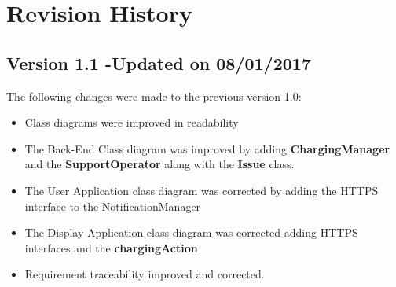 \section{Revision History}
\subsection{Version 1.1 -Updated on 08/01/2017}
The following changes were made to the previous version 1.0:
\begin{itemize}
\item Class diagrams were improved in readability
\item The Back-End Class diagram was improved by adding \textbf{ChargingManager} and the \textbf{SupportOperator} along with the \textbf{Issue} class.
\item The User Application class diagram was corrected by adding the HTTPS interface to the NotificationManager
\item The Display Application class diagram was corrected adding HTTPS interfaces and the \textbf{chargingAction}
\item Requirement traceability improved and corrected.
\end{itemize}